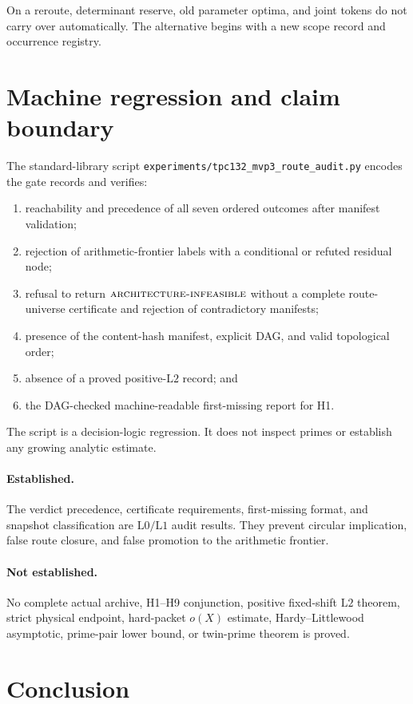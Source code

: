 \documentclass[11pt]{article}
\theoremstyle{definition}
\theoremstyle{remark}
\newcommand{\AINF}{\textnormal{\textsc{architecture-infeasible}}}
\newcommand{\Lzero}{\mathrm{L0}}
\newcommand{\Lone}{\mathrm{L1}}
\newcommand{\Ltwo}{\mathrm{L2}}
\begin{document}
On a reroute, determinant reserve, old parameter optima, and joint
tokens do not carry over automatically.  The alternative begins with
a new scope record and occurrence registry.

\section{Machine regression and claim boundary}

The standard-library script
\texttt{experiments/tpc132\_mvp3\_route\_audit.py} encodes the gate
records and verifies:
\begin{enumerate}[leftmargin=2em]
\item reachability and precedence of all seven ordered outcomes after
manifest validation;
\item rejection of arithmetic-frontier labels with a conditional or
refuted residual node;
\item refusal to return \(\AINF\) without a complete route-universe
certificate and rejection of contradictory manifests;
\item presence of the content-hash manifest, explicit DAG, and valid
topological order;
\item absence of a proved positive-\(\Ltwo\) record; and
\item the DAG-checked machine-readable first-missing report for H1.
\end{enumerate}
The script is a decision-logic regression.  It does not inspect
primes or establish any growing analytic estimate.

\paragraph{Established.}
The verdict precedence, certificate requirements, first-missing
format, and snapshot classification are \(\Lzero/\Lone\) audit
results.  They prevent circular implication, false route closure,
and false promotion to the arithmetic frontier.

\paragraph{Not established.}
No complete actual archive, H1--H9 conjunction, positive fixed-shift
\(\Ltwo\) theorem, strict physical endpoint, hard-packet
\(o(X)\) estimate, Hardy--Littlewood asymptotic, prime-pair lower
bound, or twin-prime theorem is proved.

\section{Conclusion}
\end{document}
